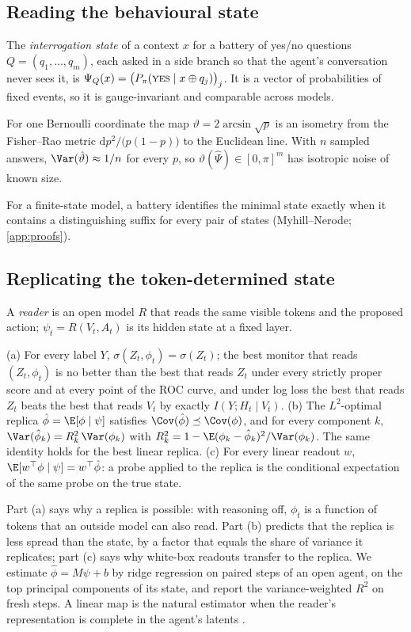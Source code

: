\subsection{Reading the behavioural state}
The \emph{interrogation state} of a context $x$ for a battery of yes/no questions $Q=(q_1,\dots,q_m)$, each asked in a side branch so that the agent's conversation never sees it, is $\Psi_Q(x)=\big(P_\pi(\textsc{yes}\mid x\oplus q_j)\big)_{j}$. It is a vector of probabilities of fixed events, so it is gauge-invariant and comparable across models.
\begin{proposition}\label{prop:fisher}
For one Bernoulli coordinate the map $\vartheta=2\arcsin\sqrt{p}$ is an isometry from the Fisher--Rao metric $\mathrm{d}p^2/\big(p(1-p)\big)$ to the Euclidean line. With $n$ sampled answers, $\Var(\hat\vartheta)\approx 1/n$ for every $p$, so $\vartheta(\hat\Psi)\in[0,\pi]^m$ has isotropic noise of known size.
\end{proposition}
For a finite-state model, a battery identifies the minimal state exactly when it contains a distinguishing suffix for every pair of states (Myhill--Nerode; \cref{app:proofs}).

\subsection{Replicating the token-determined state}
A \emph{reader} is an open model $R$ that reads the same visible tokens and the proposed action; $\psi_t=R(V_t,A_t)$ is its hidden state at a fixed layer.
\begin{proposition}\label{prop:replica}
(a) For every label $Y$, $\sigma(Z_t,\phi_t)=\sigma(Z_t)$; the best monitor that reads $(Z_t,\phi_t)$ is no better than the best that reads $Z_t$ under every strictly proper score and at every point of the ROC curve, and under log loss the best that reads $Z_t$ beats the best that reads $V_t$ by exactly $I(Y;H_t\mid V_t)$.
(b) The $L^2$-optimal replica $\hat\phi=\E[\phi\mid\psi]$ satisfies $\Cov(\hat\phi)\preceq\Cov(\phi)$, and for every component $k$, $\Var(\hat\phi_k)=R^2_k\,\Var(\phi_k)$ with $R^2_k=1-\E(\phi_k-\hat\phi_k)^2/\Var(\phi_k)$. The same identity holds for the best linear replica.
(c) For every linear readout $w$, $\E[w^\top\phi\mid\psi]=w^\top\hat\phi$: a probe applied to the replica is the conditional expectation of the same probe on the true state.
\end{proposition}
Part (a) says why a replica is possible: with reasoning off, $\phi_t$ is a function of tokens that an outside model can also read. Part (b) predicts that the replica is less spread than the state, by a factor that equals the share of variance it replicates; part (c) says why white-box readouts transfer to the replica. We estimate $\hat\phi=M\psi+b$ by ridge regression on paired steps of an open agent, on the top principal components of its state, and report the variance-weighted $R^2$ on fresh steps. A linear map is the natural estimator when the reader's representation is complete in the agent's latents \citep{zhou2026identifiabilities}.

